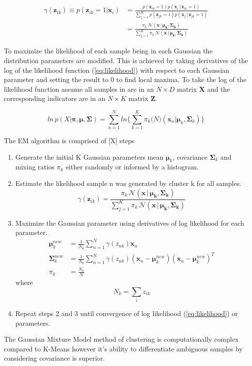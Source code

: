\begin{align}
	\gamma(\bm{z}_{ik}) \equiv p(\bm{z}_{ik} =1 | \bm{x}_i)
	\label{eq:gamma2}
	&= \frac{p(\bm{z}_{ik}=1)p(\bm{x}_i\, |\, \bm{z}_{ik} = 1)}{\sum^K_{j=1}p(\bm{z}_{jk}=1)p(\bm{x}_j\, |\, \bm{z}_{jk} = 1)}\\ 
	\label{eq:gamma3}
	&= \frac{\pi_k\, \mathcal{N}(\bm{x}\,|\,\bm{\mu_k},\bm{\Sigma_k})}{\sum_{j=1}^{K}\pi_k\, \mathcal{N}(\bm{x}\,|\,\bm{\mu_k},\bm{\Sigma_k})}
\end{align}


To maximize the likelihood of each sample being in each Gaussian the distribution parameters are modified. This is achieved by taking derivatives of the log of the likelihood function (\ref{eq:likelihood}) with respect to each Gaussian parameter and setting the result to 0 to find local maxima. To take the log of the likelihood function assume all samples in are in an $N \times D$ matrix $\bm{X}$ and the corresponding indicators are in an $ N \times K$ matrix $\bm{Z}$. 

\begin{equation}
\label{eq:log}
ln\,p(X|\bm{\pi}, \bm{\mu}, \bm{\Sigma}) = \sum_{n=1}^N
ln \Bigg\{ \sum_{k=1}^K \pi_k\mathcal(N)(\bm{x}_n|\bm{\mu}_k,\bm{\Sigma}_k)\Bigg\}
\end{equation}







\centerline{}

The EM algorithm is comprised of [X] steps

\begin{enumerate}
	\item Generate the initial K Gaussian parameters mean $\bm{\mu}_{k}$, covariance $\bm{\Sigma}_k$ and mixing ratios $\pi_k$ either randomly or informed by a histogram.
	\item Estimate the likelihood sample n was generated by cluster k for all samples. 
	\begin{equation}
		\gamma(\bm{z}_{ik})=\frac{\pi_k\, \mathcal{N}(\bm{x}\,|\,\bm{\mu_k},\bm{\Sigma_k})}{\sum_{j=1}^{K}\pi_k\, \mathcal{N}(\bm{x}\,|\,\bm{\mu_k},\bm{\Sigma_k})}
	\end{equation}

	\item Maximize the Gaussian parameter using derivatives of log likelihood for each parameter.
	\begin{align}	
	\label{eq:mean}
	\bm{\mu}_{k}^{new} &= \frac{1}{N_k}\sum_{n=1}^N \gamma(z_{nk} ) \bm{x}_n \\
	\label{eq:covariance}
	\bm{\Sigma}_k^{new} &=  \frac{1}{N_k}\sum_{n=1}^N\gamma(z_{nk})(\bm{x}_n- \bm{\mu}_k^{new})(\bm{x}_n - \bm{\mu}_k^{new})^T \\
	\label{eq:ratio}
	\pi_k &= \frac{N_k}{N}
	\end{align}
	where \newline
	\[N_k = \sum_{i} z_{ik}\]
	\item Repeat steps 2 and 3 until convergence of log likelihood (\ref{eq:likelihood}) or parameters. 
\end{enumerate}

The Gaussian Mixture Model method of clustering is computationally complex compared to K-Means however it's ability to differentiate ambiguous samples by considering covariance is superior. 